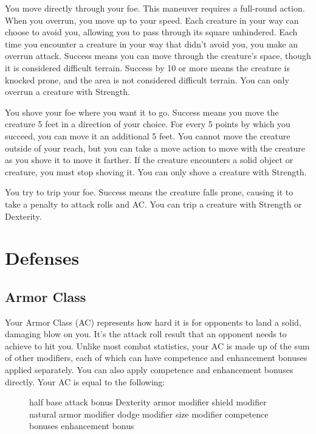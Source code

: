 \label{Overrun} You move directly through your foe. This maneuver requires a full-round action. When you overrun, you move up to your speed. Each creature in your way can choose to avoid you, allowing you to pass through its square unhindered. Each time you encounter a creature in your way that didn't avoid you, you make an overrun attack. Success means you can move through the creature's space, though it is considered difficult terrain. Success by 10 or more means the creature is knocked prone, and the area is not considered difficult terrain. You can only overrun a creature with Strength.

\label{Shove} You shove your foe where you want it to go. Success means you move the creature 5 feet in a direction of your choice. For every 5 points by which you succeed, you can move it an additional 5 feet. You cannot move the creature outside of your reach, but you can take a move action to move with the creature as you shove it to move it farther. If the creature encounters a solid object or creature, you must stop shoving it. You can only shove a creature with Strength.

\label{Trip} You try to trip your foe. Success means the creature falls prone, causing it to take a  penalty to attack rolls and AC. You can trip a creature with Strength or Dexterity.

\section{Defenses}\label{Defenses}

\subsection{Armor Class}
Your Armor Class (AC) represents how hard it is for opponents to land a solid, damaging blow on you. It's the attack roll result that an opponent needs to achieve to hit you. Unlike most combat statistics, your AC is made up of the sum of other modifiers, each of which can have competence and enhancement bonuses applied separately. You can also apply competence and enhancement bonuses directly. Your AC is equal to the following:

\begin{figure}[h]
     \add half base attack bonus \add Dexterity \add armor modifier \add shield modifier \add natural armor modifier \add dodge modifier \add size modifier \add competence bonuses \add enhancement bonus
\end{figure}


